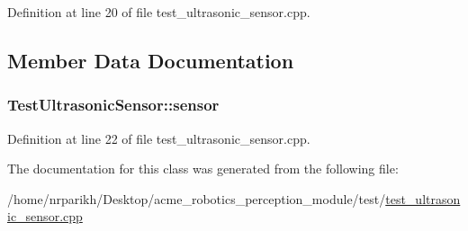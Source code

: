 Definition at line 20 of file test\+\_\+ultrasonic\+\_\+sensor.\+cpp.



\subsection{Member Data Documentation}
\subsubsection[{\texorpdfstring{sensor}{sensor}}]{ Test\+Ultrasonic\+Sensor\+::sensor\hspace{0.3cm}{\ttfamily [protected]}}\hypertarget{class_test_ultrasonic_sensor_abaaead54c0ad8a32f353b38b2f84127a}{}\label{class_test_ultrasonic_sensor_abaaead54c0ad8a32f353b38b2f84127a}


Definition at line 22 of file test\+\_\+ultrasonic\+\_\+sensor.\+cpp.



The documentation for this class was generated from the following file\+:\begin{DoxyCompactItemize}
\item 
/home/nrparikh/\+Desktop/acme\+\_\+robotics\+\_\+perception\+\_\+module/test/\hyperlink{test__ultrasonic__sensor_8cpp}{test\+\_\+ultrasonic\+\_\+sensor.\+cpp}\end{DoxyCompactItemize}

